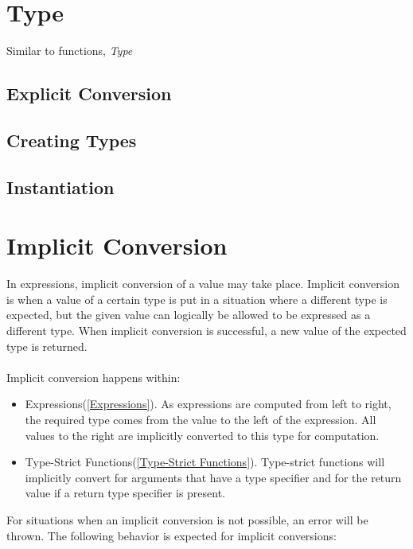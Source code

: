 \documentclass[12pt,letterpaper]{report}
\begin{document}
\section{Type}\label{Type}

Similar to functions, \textit{Type}



\subsection{Explicit Conversion}\label{Explicit Conversion}
\subsection{Creating Types}\label{Creating Types}
\subsection{Instantiation}\label{Instantiation}
\section{Implicit Conversion}\label{Implicit Conversion}

In expressions, implicit conversion of a value may take place. Implicit conversion is when 
a value of a certain type is put in a situation where a different type is expected, but the 
given value can logically be allowed to be expressed as a different type. When implicit 
conversion is successful, a new value of the expected type is returned.
\\\\
Implicit conversion happens within:
\begin{itemize}
  \item Expressions(\autoref{Expressions}). As expressions are computed from left to right, the required type comes from the value to the left of the expression. All values to the right are implicitly converted to this type for computation.
  \item Type-Strict Functions(\autoref{Type-Strict Functions}). Type-strict functions will implicitly convert for arguments that have a type specifier and for the return value if a return type specifier is present.
\end{itemize}

For situations when an implicit conversion is not possible, an error will be thrown.
The following behavior is expected for implicit conversions:
\end{document}

